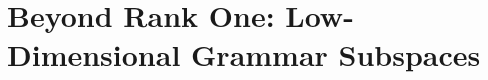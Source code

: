 \documentclass[11pt]{report}
\begin{document}

\section{Beyond Rank One: Low-Dimensional Grammar Subspaces}
\label{sec:beyond_rank_one}
\end{document}
